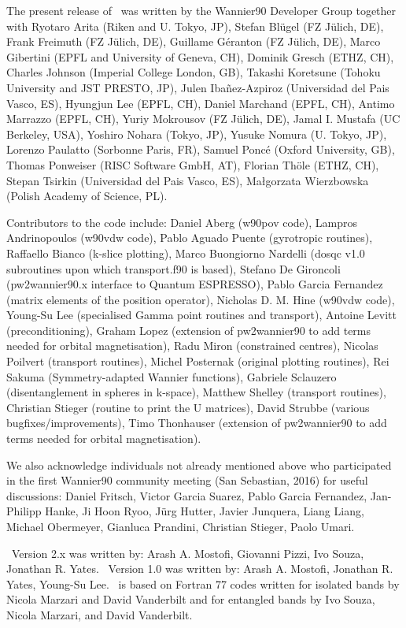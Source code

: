 The present release of \wannier\ was written by the Wannier90 Developer Group together
with Ryotaro Arita (Riken and U. Tokyo, JP),
Stefan Bl\"ugel (FZ  J\"ulich, DE),
Frank Freimuth (FZ  J\"ulich, DE),
Guillame G\'eranton (FZ  J\"ulich, DE),
Marco Gibertini (EPFL and University of Geneva, CH),
Dominik Gresch (ETHZ, CH),
Charles Johnson (Imperial College London, GB),
Takashi Koretsune (Tohoku University and JST PRESTO, JP),
Julen Iba\~nez-Azpiroz (Universidad del Pais Vasco, ES),
Hyungjun Lee (EPFL, CH),
Daniel Marchand (EPFL, CH),
Antimo Marrazzo (EPFL, CH),
Yuriy Mokrousov (FZ  J\"ulich, DE),
Jamal I. Mustafa (UC Berkeley, USA),
Yoshiro Nohara (Tokyo, JP),
Yusuke Nomura (U. Tokyo, JP),
Lorenzo Paulatto (Sorbonne Paris, FR),
Samuel Ponc\'e (Oxford University, GB),
Thomas Ponweiser (RISC Software GmbH, AT),
Florian Th\"ole (ETHZ, CH),
Stepan Tsirkin (Universidad del Pais Vasco, ES),
Ma\l{}gorzata Wierzbowska (Polish Academy of Science, PL).

Contributors to the code include:
Daniel Aberg (w90pov code), 
Lampros Andrinopoulos (w90vdw code),
Pablo Aguado Puente (gyrotropic routines),
Raffaello Bianco (k-slice plotting),
Marco Buongiorno Nardelli (dosqc v1.0 subroutines upon which transport.f90 is based),
Stefano De Gironcoli (pw2wannier90.x interface to Quantum ESPRESSO),
Pablo Garcia Fernandez (matrix elements of the position operator),
Nicholas D. M. Hine (w90vdw code),
Young-Su Lee (specialised Gamma point routines and transport),
Antoine Levitt (preconditioning),
Graham Lopez (extension of pw2wannier90 to add terms needed for orbital magnetisation),
Radu Miron (constrained centres),
Nicolas Poilvert (transport routines),
Michel Posternak (original plotting routines),
Rei Sakuma (Symmetry-adapted Wannier functions),
Gabriele Sclauzero (disentanglement in spheres in k-space),
Matthew Shelley (transport routines),
Christian Stieger (routine to print the U matrices),
David Strubbe (various bugfixes/improvements),
Timo Thonhauser (extension of pw2wannier90 to add terms needed for orbital magnetisation).

We also acknowledge individuals not already mentioned above who participated in the first Wannier90 community meeting (San Sebastian, 2016) for useful discussions:
Daniel Fritsch,
Victor Garcia Suarez,
Pablo Garcia Fernandez,
Jan-Philipp Hanke,
Ji Hoon Ryoo,
J\"urg Hutter,
Javier Junquera,
Liang Liang,
Michael Obermeyer,
Gianluca Prandini,
Christian Stieger,
Paolo Umari.

\wannier\ Version 2.x was written by:
Arash A. Mostofi, Giovanni Pizzi, Ivo Souza, Jonathan R. Yates.
\wannier\ Version 1.0 was written by:
Arash A. Mostofi, Jonathan R. Yates, Young-Su Lee.
\wannier\ is based on Fortran 77 codes written for isolated bands by Nicola Marzari
and David Vanderbilt and for entangled bands by Ivo Souza, Nicola Marzari,
and David Vanderbilt.

